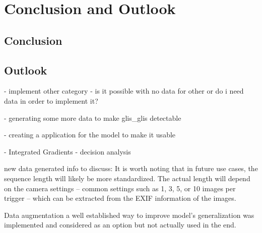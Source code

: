 


\section{Conclusion and Outlook}
\label{conclusion_outlook}

    \subsection{Conclusion}

    \subsection{Outlook}
    - implement other category - is it possible with no data for other or do i need data in order to implement it?

    - generating some more data to make glis\_glis detectable

    - creating a application for the model to make it usable

    - Integrated Gradients - decision analysis


    new data generated info to discuss:
    It is worth noting that in future use cases, the sequence length will likely be more standardized.
    The actual length will depend on the camera settings -- common settings such as 1, 3, 5, or 10 images per trigger -- which can be extracted from the EXIF information of the images.

    Data augmentation a well established way to improve model's generalization \autocite{shortenSurveyImageData2019} was implemented and considered as an option but not actually used in the end.
